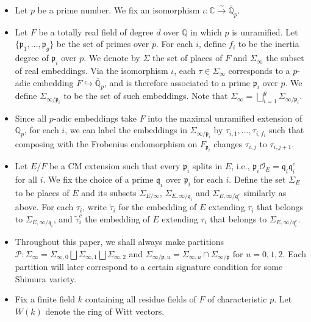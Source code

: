 \documentclass{article}
\begin{document}
\begin{itemize}
	\item Let $p$ be a prime number. We fix an isomorphism $\iota: \mathbb{C}\stackrel{\sim}{\longrightarrow} \overline{\mathbb{Q}}_p$.
	\item Let $F$ be a totally real field of degree $d$ over $\mathbb{Q}$ in which $p$ is unramified. Let $\{\mathfrak{p}_1,\dots,\mathfrak{p}_g\}$ be the set of primes over $p$. For each $i$, define $f_i$ to be the inertia degree of $\mathfrak{p}_i$ over $p$. We denote by $\Sigma$ the set of places of $F$ and $\Sigma_\infty$ the subset of real embeddings. Via the isomorphism $\iota$, each $\tau\in \Sigma_\infty$ corresponds to a $p$-adic embedding $F\hookrightarrow \overline{\mathbb{Q}}_p$, and is therefore associated to a prime $\mathfrak{p}_i$ over $p$. We define $\Sigma_{\infty/\mathfrak{p}_i}$ to be the set of such embeddings. Note that $\Sigma_\infty=\bigsqcup_{i=1}^g \Sigma_{\infty/\mathfrak{p}_i}$.
	\item Since all $p$-adic embeddings take $F$ into the maximal unramified extension of $\mathbb{Q}_p$, for each $i$, we can label the embeddings in $\Sigma_{\infty/\mathfrak{p}_i}$ by $\tau_{i,1},\dots,\tau_{i,f_i}$ such that composing with the Frobenius endomorphism on $F_{\mathfrak{p}_i}$ changes $\tau_{i,j}$ to $\tau_{i,j+1}$.
	\item Let $E/F$ be a CM extension such that every $\mathfrak{p}_i$ splits in $E$, i.e., $\mathfrak{p}_i\mathcal{O}_E=\mathfrak{q}_i{\mathfrak{q}}_i^c$ for all $i$. We fix the choice of a prime $\mathfrak{q}_i$ over $\mathfrak{p}_i$ for each $i$. Define the set $\Sigma_E$ to be places of $E$ and its subsets $\Sigma_{E/\infty}$, $\Sigma_{E,\infty/\mathfrak{q}_i}$ and $\Sigma_{E,\infty/{\mathfrak{q}}_i^c}$ similarly as above. For each $\tau_i$, write $\tilde{\tau}_i$ for the embedding of $E$ extending $\tau_i$ that belongs to $\Sigma_{E,\infty/\mathfrak{q}_i}$, and $\tilde{\tau}^c_i$ the embedding of $E$ extending $\tau_i$ that belongs to $\Sigma_{E,\infty/{\mathfrak{q}}_i^c}$.
	\item Throughout this paper, we shall always make partitions $\mathcal{P}:\Sigma_\infty=\Sigma_{\infty,0}\bigsqcup\Sigma_{\infty,1}\bigsqcup\Sigma_{\infty,2}$ and $\Sigma_{\infty/\mathfrak{p},u}=\Sigma_{\infty,u}\cap \Sigma_{\infty/\mathfrak{p}}$ for $u=0,1,2$. Each partition will later correspond to a certain signature condition for some Shimura variety.
	\item Fix a finite field $k$ containing all residue fields of $F$ of characteristic $p$. Let $W(k)$ denote the ring of Witt vectors.
\end{itemize}
\end{document}
